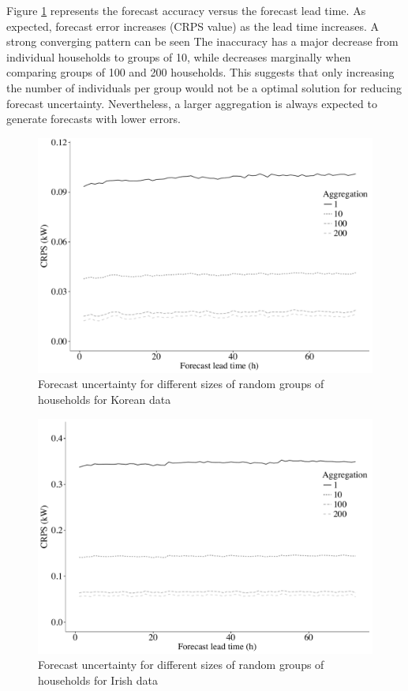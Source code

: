 \documentclass[review, 3p, 12pt, authoryear]{elsarticle}
\begin{document}
Figure \ref{fig:rndgrp} represents the forecast accuracy versus the forecast lead time.
As expected, forecast error increases (CRPS value) as the lead time increases.
A strong converging pattern can be seen
The inaccuracy has a major decrease from individual households to groups of 10, while decreases marginally when comparing groups of 100 and 200 households.
This suggests that only increasing the number of individuals per group would not be a optimal solution for reducing forecast uncertainty.
Nevertheless, a larger aggregation is always expected to generate forecasts with lower errors.

\begin{figure}
  \centering
  \includegraphics[width=0.8\columnwidth]{2017-10-13_rndgrp}
  \caption{Forecast uncertainty for different sizes of random groups of households for Korean data}
  \label{fig:rndgrp}
\end{figure}

\begin{figure}
  \centering
  \includegraphics[width=0.8\columnwidth]{2017-12-27_rndgrp_IR}
  \caption{Forecast uncertainty for different sizes of random groups of households for Irish data}
  \label{fig:rndgrpIR}
\end{figure}
\end{document}

